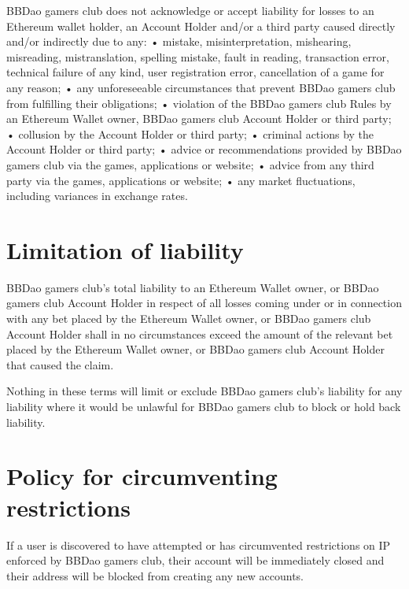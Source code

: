 \documentclass[
]{book}
\begin{document}
BBDao gamers club does not acknowledge or accept liability for losses to an Ethereum wallet holder, an Account Holder and/or a third party caused directly and/or indirectly due to any:
• mistake, misinterpretation, mishearing, misreading, mistranslation, spelling mistake, fault in reading, transaction error, technical failure of any kind, user registration error, cancellation of a game for any reason;
• any unforeseeable circumstances that prevent BBDao gamers club from fulfilling their obligations;
• violation of the BBDao gamers club Rules by an Ethereum Wallet owner, BBDao gamers club Account Holder or third party;
• collusion by the Account Holder or third party;
• criminal actions by the Account Holder or third party;
• advice or recommendations provided by BBDao gamers club via the games, applications or website;
• advice from any third party via the games, applications or website;
• any market fluctuations, including variances in exchange rates.

\hypertarget{limitation-of-liability}{%
\section{Limitation of liability}\label{limitation-of-liability}}

BBDao gamers club's total liability to an Ethereum Wallet owner, or BBDao gamers club Account Holder in respect of all losses coming under or in connection with any bet placed by the Ethereum Wallet owner, or BBDao gamers club Account Holder shall in no circumstances exceed the amount of the relevant bet placed by the Ethereum Wallet owner, or BBDao gamers club Account Holder that caused the claim.

Nothing in these terms will limit or exclude BBDao gamers club's liability for any liability where it would be unlawful for BBDao gamers club to block or hold back liability.

\hypertarget{policy-for-circumventing-restrictions}{%
\section{Policy for circumventing restrictions}\label{policy-for-circumventing-restrictions}}

If a user is discovered to have attempted or has circumvented restrictions on IP enforced by BBDao gamers club, their account will be immediately closed and their address will be blocked from creating any new accounts.

  
\end{document}
